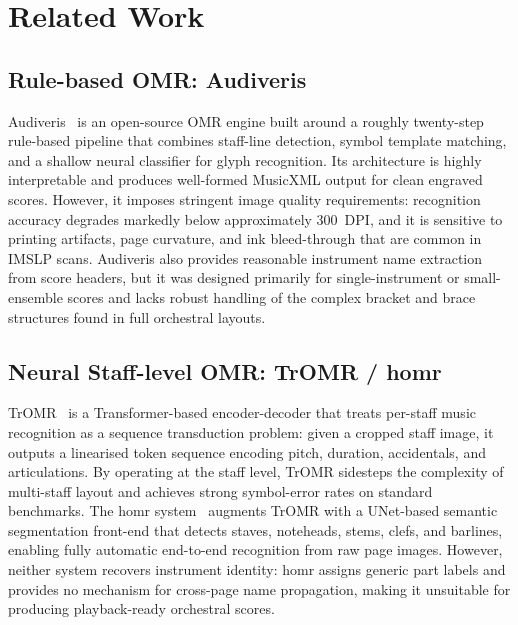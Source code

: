 \documentclass[11pt,a4paper]{article}
\begin{document}
\section{Related Work}

\subsection{Rule-based OMR: Audiveris}

Audiveris~\cite{audiveris} is an open-source OMR engine built around a roughly twenty-step rule-based pipeline that combines staff-line detection, symbol template matching, and a shallow neural classifier for glyph recognition.
Its architecture is highly interpretable and produces well-formed MusicXML output for clean engraved scores.
However, it imposes stringent image quality requirements: recognition accuracy degrades markedly below approximately 300~DPI, and it is sensitive to printing artifacts, page curvature, and ink bleed-through that are common in IMSLP scans.
Audiveris also provides reasonable instrument name extraction from score headers, but it was designed primarily for single-instrument or small-ensemble scores and lacks robust handling of the complex bracket and brace structures found in full orchestral layouts.

\subsection{Neural Staff-level OMR: TrOMR / homr}

TrOMR~\cite{tromr} is a Transformer-based encoder-decoder that treats per-staff music recognition as a sequence transduction problem: given a cropped staff image, it outputs a linearised token sequence encoding pitch, duration, accidentals, and articulations.
By operating at the staff level, TrOMR sidesteps the complexity of multi-staff layout and achieves strong symbol-error rates on standard benchmarks.
The homr system~\cite{oemer} augments TrOMR with a UNet-based semantic segmentation front-end that detects staves, noteheads, stems, clefs, and barlines, enabling fully automatic end-to-end recognition from raw page images.
However, neither system recovers instrument identity: homr assigns generic part labels and provides no mechanism for cross-page name propagation, making it unsuitable for producing playback-ready orchestral scores.
\end{document}
